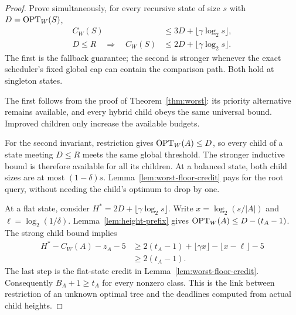 \begin{proof}
Prove simultaneously, for every recursive state of size $s$ with
$D=\operatorname{OPT}_W(S)$,
\begin{align}
 C_W(S)&\le3D+\lfloor\gamma\log_2s\rfloor,
                   \label{eq:slot-universal-invariant}\\
 D\le R\quad\Longrightarrow\quad
 C_W(S)&\le2D+\lfloor\gamma\log_2s\rfloor.
                   \label{eq:slot-restricted-invariant}
\end{align}
The first is the fallback guarantee; the second is stronger whenever
the exact scheduler's fixed global cap can contain the comparison
path. Both hold at singleton states.

The first follows from the proof of Theorem~\ref{thm:worst}:
its priority alternative remains available, and every hybrid child
obeys the same universal bound. Improved children only increase the
available budgets.

For the second invariant, restriction gives $\operatorname{OPT}_W(A)\le D$,
so every child of a state meeting $D\le R$ meets the same global
threshold. The stronger inductive bound is therefore available for
all its children. At a balanced state, both child sizes are at most
$(1-\delta)s$. Lemma~\ref{lem:worst-floor-credit} pays for the root
query, without needing the child's optimum to drop by one.

At a flat state, consider
$H^*=2D+\lfloor\gamma\log_2s\rfloor$. Write
$x=\log_2(s/|A|)$ and $\ell=\log_2(1/\delta)$.
Lemma~\ref{lem:height-prefix} gives
$\operatorname{OPT}_W(A)\le D-(t_A-1)$. The strong child bound implies
\begin{equation}\label{eq:slot-deadline-credit}
\begin{aligned}
 H^*-C_W(A)-z_A-5
 &\ge2(t_A-1)+\lfloor\gamma x\rfloor
                         -\lfloor x-\ell\rfloor-5\\
 &\ge2(t_A-1).
\end{aligned}
\end{equation}
The last step is the flat-state credit in
Lemma~\ref{lem:worst-floor-credit}.
Consequently $B_A+1\ge t_A$ for every nonzero class.
This is the link between restriction of an unknown optimal tree and
the deadlines computed from actual child heights.


\end{proof}
